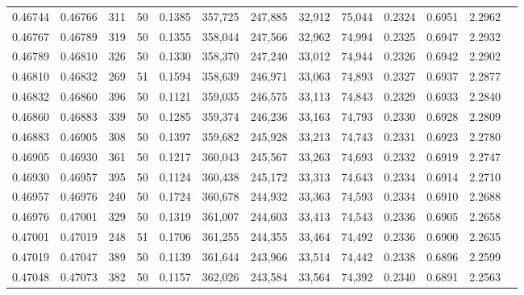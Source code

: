 \begin{tabular}{rrrrrrrrrrrrr}
0.46744 & 0.46766 &   311 &  50 &                                     0.1385 & 357,725 & 247,885 &  32,912 &  75,044 & 0.2324 & 0.6951 & 2.2962 \\
0.46767 & 0.46789 &   319 &  50 &                                     0.1355 & 358,044 & 247,566 &  32,962 &  74,994 & 0.2325 & 0.6947 & 2.2932 \\
0.46789 & 0.46810 &   326 &  50 &                                     0.1330 & 358,370 & 247,240 &  33,012 &  74,944 & 0.2326 & 0.6942 & 2.2902 \\
0.46810 & 0.46832 &   269 &  51 &                                     0.1594 & 358,639 & 246,971 &  33,063 &  74,893 & 0.2327 & 0.6937 & 2.2877 \\
0.46832 & 0.46860 &   396 &  50 &                                     0.1121 & 359,035 & 246,575 &  33,113 &  74,843 & 0.2329 & 0.6933 & 2.2840 \\
0.46860 & 0.46883 &   339 &  50 &                                     0.1285 & 359,374 & 246,236 &  33,163 &  74,793 & 0.2330 & 0.6928 & 2.2809 \\
0.46883 & 0.46905 &   308 &  50 &                                     0.1397 & 359,682 & 245,928 &  33,213 &  74,743 & 0.2331 & 0.6923 & 2.2780 \\
0.46905 & 0.46930 &   361 &  50 &                                     0.1217 & 360,043 & 245,567 &  33,263 &  74,693 & 0.2332 & 0.6919 & 2.2747 \\
0.46930 & 0.46957 &   395 &  50 &                                     0.1124 & 360,438 & 245,172 &  33,313 &  74,643 & 0.2334 & 0.6914 & 2.2710 \\
0.46957 & 0.46976 &   240 &  50 &                                     0.1724 & 360,678 & 244,932 &  33,363 &  74,593 & 0.2334 & 0.6910 & 2.2688 \\
0.46976 & 0.47001 &   329 &  50 &                                     0.1319 & 361,007 & 244,603 &  33,413 &  74,543 & 0.2336 & 0.6905 & 2.2658 \\
0.47001 & 0.47019 &   248 &  51 &                                     0.1706 & 361,255 & 244,355 &  33,464 &  74,492 & 0.2336 & 0.6900 & 2.2635 \\
0.47019 & 0.47047 &   389 &  50 &                                     0.1139 & 361,644 & 243,966 &  33,514 &  74,442 & 0.2338 & 0.6896 & 2.2599 \\
0.47048 & 0.47073 &   382 &  50 &                                     0.1157 & 362,026 & 243,584 &  33,564 &  74,392 & 0.2340 & 0.6891 & 2.2563 \\

\end{tabular}
